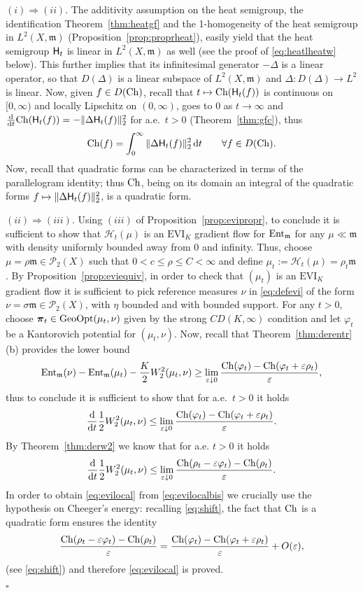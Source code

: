 \documentclass[reqno,11pt]{article}
\numberwithin{equation}{section}
\newcommand{\C}{\mathbb{C}}
\newcommand{\mm}{{\mbox{\boldmath$m$}}}
\newcommand{\ppi}{{\mbox{\boldmath$\pi$}}}
\renewcommand{\d}{{\mathrm d}}
\newcommand{\eps}{\varepsilon}
\newcommand{\EVI}[4]{\mathrm{EVI}_{#4}(#1,{#2}_W,#3)}
\newcommand{\ProbabilitiesTwo}[1]{\mathscr P_2(#1)}     %
\newenvironment{proof}{\removelastskip\par\medskip   %
\noindent{\em Proof.}
\rm}{\penalty-20\null\hfill$\square$\par\medbreak}
\newcommand{\ent}[1]{{\rm Ent}_{\mm}(#1)}              %
\newcommand{\entv}{{\rm Ent}_{\mm}}                    %
\newcommand{\probt}{\ProbabilitiesTwo}
\newcommand{\gopt}{{\rm{GeoOpt}}}                   %
\renewcommand{\C}{{\rm Ch}}
\newcommand{\heatl}{{\sf H}}
\newcommand{\heatw}{{\mathscr H}}
\newcommand{\Deltam}{\Delta}
\renewcommand{\EVI}{\ensuremath{\mathrm{EVI}}}
\renewcommand{\mm}{\mathfrak m}
\begin{document}
\begin{proof} $(i)\Rightarrow(ii)$. The additivity assumption on the heat semigroup,
the identification
Theorem~\ref{thm:heatgf} and the 1-homogeneity of the heat semigroup
in $L^2(X,\mm)$ (Proposition~\ref{prop:proprheat}), easily yield
that the heat semigroup $\heatl_t$ is linear in $L^2(X,\mm)$ as well
(see the proof of \eqref{eq:heatlheatw} below). This further implies
that its infinitesimal generator $-\Deltam$ is a linear operator, so
that $D(\Deltam)$ is a linear subspace of $L^2(X,\mm)$ and
$\Deltam:D(\Deltam)\to L^2$ is linear. Now, given $f\in D(\C)$, recall
that $t\mapsto \C(\heatl_t(f))$ is continuous on $[0,\infty)$ and
locally Lipschitz on $(0,\infty)$, goes to 0 as $t\to\infty$ and
$\tfrac{\d}{\d t}\C(\heatl_t(f))=-\|\Deltam \heatl_t(f)\|^2_2$ for
a.e.~$t>0$ (Theorem~\ref{thm:gfc}), thus
\[
\C(f)=\int_0^\infty\|\Deltam \heatl_t(f)\|^2_2\,\d t\qquad\forall
f\in D(\C).
\]
Now, recall that quadratic forms can be characterized in terms of
the parallelogram identity; thus $\C$, being on its domain an
integral of the quadratic forms $f\mapsto \|\Deltam
\heatl_t(f)\|^2_2$, is a quadratic form.

\noindent$(ii)\Rightarrow(iii)$. Using $(iii)$ of
Proposition~\ref{prop:evipropr}, to conclude it is sufficient to
show that $\heatw_t(\mu)$ is an $\EVI_K$ gradient flow for $\entv$
for any $\mu\ll\mm$ with density uniformly bounded away from 0 and
infinity. Thus, choose $\mu=\rho\mm\in\probt X$ such that
$0<c\leq\rho\leq C<\infty$ and define
$\mu_t:=\heatw_t(\mu)=\rho_t\mm$. By
Proposition~\ref{prop:eviequiv}, in order to check that $(\mu_t)$ is
an $\EVI_K$ gradient flow it is sufficient to pick reference
measures $\nu$ in \eqref{eq:defevi} of the form
$\nu=\sigma\mm\in\probt X$, with $\eta$ bounded and with bounded
support. For any $t>0$, choose $\ppi_t\in\gopt(\mu_t,\nu)$ given by
the strong $CD(K,\infty)$ condition and let $\varphi_t$ be a
Kantorovich potential for $(\mu_t,\nu)$. Now, recall that
Theorem~\ref{thm:derentr}(b) provides the lower bound
\[
\ent{\nu}-\ent{\mu_t}-\frac K2W_2^2(\mu_t,\nu)\geq
\lim_{\eps\downarrow
0}\frac{\C(\varphi_t)-\C(\varphi_t+\eps\rho_t)}{\eps},
\]
thus to conclude it is sufficient to show that for a.e.~$t>0$ it
holds
\begin{equation}
\label{eq:evilocal} \frac{\d}{\d t}\frac12W_2^2(\mu_t,\nu)\leq
\lim_{\eps\downarrow
0}\frac{\C(\varphi_t)-\C(\varphi_t+\eps\rho_t)}{\eps}.
\end{equation}
 By Theorem~\ref{thm:derw2} we know that for a.e.
$t>0$ it holds
\begin{equation}\label{eq:evilocalbis}
\frac{\d}{\d t}\frac12W_2^2(\mu_t,\nu)\leq\lim_{\eps\downarrow
0}\frac{\C(\rho_t-\eps\varphi_t)-\C(\rho_t)}{\eps}.
\end{equation}
In order to obtain \eqref{eq:evilocal} from \eqref{eq:evilocalbis}
we crucially use the hypothesis on Cheeger's energy: recalling
\eqref{eq:shift}, the fact that $\C$ is a quadratic form ensures the
identity
\[
 \frac{\C(\rho_t-\eps\varphi_t)-\C(\rho_t)}{\eps}
 =\frac{\C(\varphi_t)-\C(\varphi_t+\eps\rho_t)}{\eps}+O(\eps),
\]
(see \eqref{eq:shift}) and therefore \eqref{eq:evilocal} is proved.


\end{proof}
\end{document}
